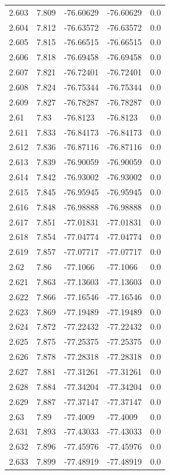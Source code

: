 \begin{tabular}{lllll}
2.603 & 7.809 & -76.60629 & -76.60629 & 0.0 \\
2.604 & 7.812 & -76.63572 & -76.63572 & 0.0 \\
2.605 & 7.815 & -76.66515 & -76.66515 & 0.0 \\
2.606 & 7.818 & -76.69458 & -76.69458 & 0.0 \\
2.607 & 7.821 & -76.72401 & -76.72401 & 0.0 \\
2.608 & 7.824 & -76.75344 & -76.75344 & 0.0 \\
2.609 & 7.827 & -76.78287 & -76.78287 & 0.0 \\
2.61 & 7.83 & -76.8123 & -76.8123 & 0.0 \\
2.611 & 7.833 & -76.84173 & -76.84173 & 0.0 \\
2.612 & 7.836 & -76.87116 & -76.87116 & 0.0 \\
2.613 & 7.839 & -76.90059 & -76.90059 & 0.0 \\
2.614 & 7.842 & -76.93002 & -76.93002 & 0.0 \\
2.615 & 7.845 & -76.95945 & -76.95945 & 0.0 \\
2.616 & 7.848 & -76.98888 & -76.98888 & 0.0 \\
2.617 & 7.851 & -77.01831 & -77.01831 & 0.0 \\
2.618 & 7.854 & -77.04774 & -77.04774 & 0.0 \\
2.619 & 7.857 & -77.07717 & -77.07717 & 0.0 \\
2.62 & 7.86 & -77.1066 & -77.1066 & 0.0 \\
2.621 & 7.863 & -77.13603 & -77.13603 & 0.0 \\
2.622 & 7.866 & -77.16546 & -77.16546 & 0.0 \\
2.623 & 7.869 & -77.19489 & -77.19489 & 0.0 \\
2.624 & 7.872 & -77.22432 & -77.22432 & 0.0 \\
2.625 & 7.875 & -77.25375 & -77.25375 & 0.0 \\
2.626 & 7.878 & -77.28318 & -77.28318 & 0.0 \\
2.627 & 7.881 & -77.31261 & -77.31261 & 0.0 \\
2.628 & 7.884 & -77.34204 & -77.34204 & 0.0 \\
2.629 & 7.887 & -77.37147 & -77.37147 & 0.0 \\
2.63 & 7.89 & -77.4009 & -77.4009 & 0.0 \\
2.631 & 7.893 & -77.43033 & -77.43033 & 0.0 \\
2.632 & 7.896 & -77.45976 & -77.45976 & 0.0 \\
2.633 & 7.899 & -77.48919 & -77.48919 & 0.0 \\

\end{tabular}
